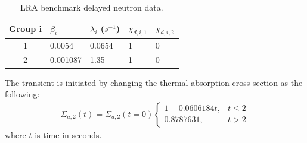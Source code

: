 \documentclass{anstrans}
\begin{document}
\begin{table}[!htbp]
    \centering
      \begin{tabular}{|c|l|l|l|l|}
      \hline
      Group i & $\beta_i$ & $\lambda_i$ ($s^{-1}$) & $\chi_{d,i,1}$ & $\chi_{d,i,2}$ \\
      \hline
      1       & 0.0054    & 0.0654  & 1 & 0 \\
      2       & 0.001087  & 1.35    & 1 & 0 \\
      \hline
      \end{tabular}
    \caption{LRA benchmark delayed neutron data.\label{tab:lra-dnp}}
\end{table}

\begin{table}[!htbp]
    \centering
    \caption{LRA benchmark scalar values.\label{tab:lra-scalar}}
\end{table}


The transient is initiated by changing the thermal absorption cross section as the following:
\begin{align}
\Sigma_{a,2}(t) = \Sigma_{a,2}(t=0) \left\{\begin{array}{lr} 1-0.0606184t, & t\leq 2 \\
                                                             0.8787631, & t>2
                                           \end{array}\right.
\end{align}
where $t$ is time in seconds.\\
\end{document}

